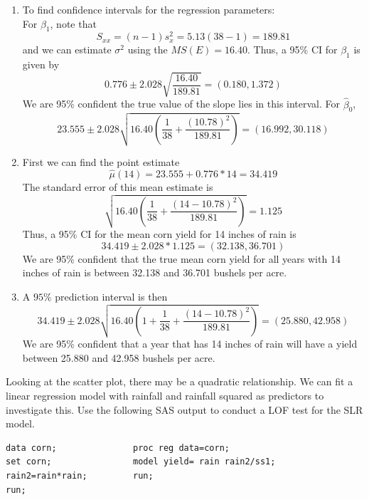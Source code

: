 \documentclass{report}
\begin{document}
\begin{enumerate}
\item To find confidence intervals for the regression parameters:\\
For $\beta_1$, note that \\
$$S_{xx}=(n-1)s_x^2=5.13(38-1)=189.81$$
and we can estimate $\sigma^2$ using the $MS(E)=16.40$.  Thus, a 95\% CI for $\beta_1$ is given by
$$0.776 \pm 2.028 \sqrt{\frac{16.40}{189.81}} =(0.180, 1.372)$$
We are 95\% confident the true value of the slope lies in this interval.
For $\hat{\beta}_0$,
$$ 23.555 \pm 2.028 \sqrt{16.40\left(\frac{1}{38}+\frac{(10.78)^2}{189.81}\right)} =(16.992, 30.118)$$
\item First we can find the point estimate 
$$\hat\mu(14)=23.555+0.776*14 =  34.419$$ 
The standard error of this mean estimate is 
$$ \sqrt{16.40\left(\frac{1}{38}+\frac{(14-10.78)^2}{189.81}\right)}=1.125  $$
Thus, a 95\% CI for the mean corn yield for 14 inches of rain is
$$34.419 \pm 2.028*1.125 = (32.138, 36.701)$$
We are 95\% confident that the true mean corn yield for all years with 14 inches of rain is between 32.138 and 36.701 bushels per acre.
\item A $95\%$ prediction interval is then
$$ 34.419 \pm 2.028 \sqrt{16.40\left(1+\frac{1}{38}+\frac{(14-10.78)^2}{189.81}\right)}=(25.880, 42.958) $$
We are 95\% confident that a year that has 14 inches of rain will have a yield between 25.880 and 42.958 bushels per acre.
\end{enumerate}

\newpage

Looking at the scatter plot, there may be a quadratic relationship.  We can fit a linear regression model with rainfall and rainfall squared as predictors to investigate this. Use the following SAS output to conduct a LOF test for the SLR model.
\begin{small}
\begin{verbatim}
data corn;               proc reg data=corn;
set corn;                model yield= rain rain2/ss1;
rain2=rain*rain;         run;
run;
\end{verbatim}
\end{small}
\end{document}
